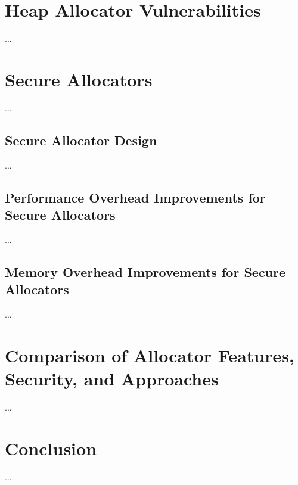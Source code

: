 \documentclass[conference]{IEEEtran}
\begin{document}
\section{Heap Allocator Vulnerabilities}
 {\color{red}...}

\section{Secure Allocators}
 {\color{red}...}

\subsection{Secure Allocator Design}
{\color{red}...}

\subsection{Performance Overhead Improvements for Secure Allocators}
{\color{red}...}

\subsection{Memory Overhead Improvements for Secure Allocators}
{\color{red}...}

\section{Comparison of Allocator Features, Security, and Approaches}
 {\color{red}...}

\section{Conclusion}
 {\color{red}...}
\end{document}
